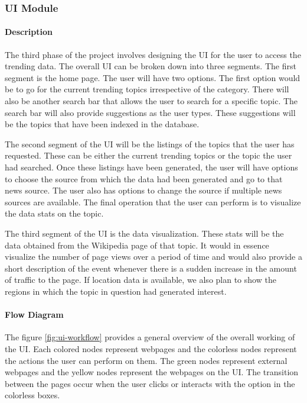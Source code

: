 \subsubsection{UI Module}

\paragraph{Description}\mbox{}

The third phase of the project involves designing the UI for the user to access the trending data. The overall UI can be broken down into three segments. The first segment is the home page. The user will have two options. The first option would be to go for the current trending topics irrespective of the category. There will also be another search bar that allows the user to search for a specific topic. The search bar will also provide suggestions as the user types. These suggestions will be the topics that have been indexed in the database.

The second segment of the UI will be the listings of the topics that the user has requested. These can be either the current trending topics or the topic the user had searched. Once these listings have been generated, the user will have options to choose the source from which the data had been generated and go to that news source. The user also has options to change the source if multiple news sources are available. The final operation that the user can perform is to visualize the data stats on the topic.

The third segment of the UI is the data visualization. These stats will be the data obtained from the Wikipedia page of that topic. It would in essence visualize the number of page views over a period of time and would also provide a short description of the event whenever there is a sudden increase in the amount of traffic to the page. If location data is available, we also plan to show the regions in which the topic in question had generated interest. 

\paragraph{Flow Diagram}\mbox{}

The figure \ref{fig:ui-workflow} provides a general overview of the overall working of the UI.  Each colored nodes represent webpages and the colorless nodes represent the actions the user can perform on them. The green nodes represent external webpages and the yellow nodes represent the webpages on the UI. The transition between the pages occur when the user clicks or interacts with the option in the colorless boxes. 

